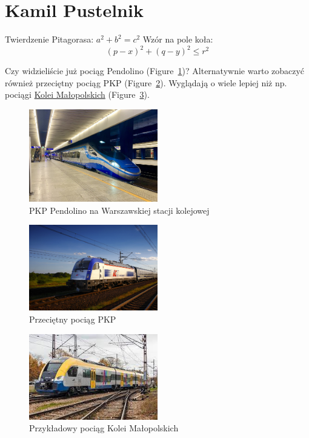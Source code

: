 \section{Kamil Pustelnik}
\label{sec:kpust}

Twierdzenie Pitagorasa: $a^2 + b^2 = c^2$
Wzór na pole koła: \[(p - x)^2 + (q - y)^2 \leq r^2\]

Czy widzieliście już pociąg Pendolino (Figure~\ref{fig:pendolino})?
Alternatywnie warto zobaczyć również przeciętny pociąg PKP (Figure~\ref{fig:pociag_pkp}).
Wyglądają o wiele lepiej niż np. pociągi \href{https://kolejemalopolskie.com.pl/}{Kolei Małopolskich} (Figure~\ref{fig:pociag_kmp}).

\begin{figure}[htbp]
    \centering
    \label{fig:pendolino}
    \includegraphics[width=0.5\textwidth]{pictures/Pendolino.jpg}
    \caption{PKP Pendolino na Warszawskiej stacji kolejowej}
\end{figure}

\begin{figure}[htbp]
    \centering
    \label{fig:pociag_pkp}
    \includegraphics[width=0.5\textwidth]{pictures/pociag_pkp.jpg}
    \caption{Przeciętny pociąg PKP}
\end{figure}

\begin{figure}[htbp]
    \centering
    \label{fig:pociag_kmp}
    \includegraphics[width=0.5\textwidth]{pictures/pociag_KMP.jpeg}
    \caption{Przykładowy pociąg Kolei Małopolskich}
\end{figure}


